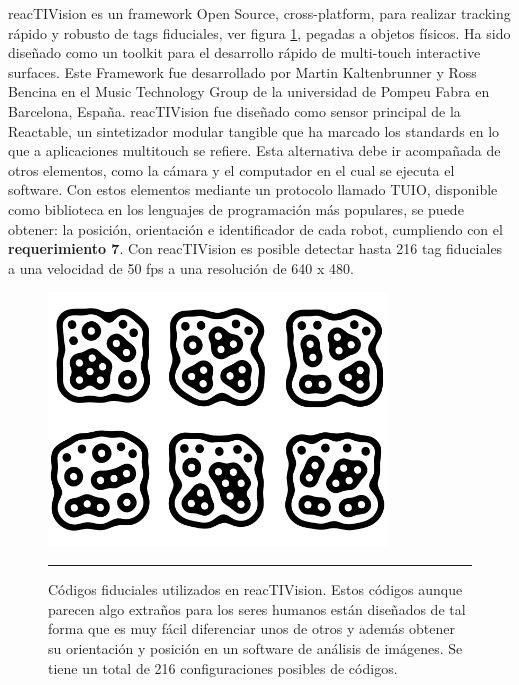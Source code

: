 reacTIVision \cite{kaltenbrunner2007reactivision} es un framework Open Source, cross-platform, para realizar tracking rápido y robusto de tags fiduciales, ver figura \ref{fig:Fiducial}, pegadas a objetos físicos. Ha sido diseñado como un toolkit para el desarrollo rápido de multi-touch interactive surfaces. Este Framework fue desarrollado por Martin Kaltenbrunner y Ross Bencina en el Music Technology Group de la universidad de Pompeu Fabra en Barcelona, España. reacTIVision fue diseñado como sensor principal de la Reactable, un sintetizador modular tangible que ha marcado los standards en lo que a aplicaciones multitouch se refiere. 
Esta alternativa debe ir acompañada de otros elementos, como la cámara y el computador en el cual se ejecuta el software. Con estos elementos mediante un protocolo llamado TUIO, disponible como biblioteca en los lenguajes de programación más populares, se puede obtener: la posición, orientación e identificador de cada robot, cumpliendo con el \textbf{requerimiento 7}. Con reacTIVision es posible detectar hasta 216 tag fiduciales a una velocidad de 50 fps a una resolución de 640 x 480.




\begin{figure}[htbp]
	\centering
		\includegraphics[width=0.8\textwidth]{./Figures/MODI/fiducial.png}
		\rule{35em}{0.5pt}
	\caption[Fiduciales usados como tag en reacTIVision]{Códigos fiduciales utilizados en reacTIVision. Estos códigos aunque parecen algo extraños para los seres humanos están diseñados de tal forma que es muy fácil diferenciar unos de otros y además obtener su orientación y posición en un software de análisis de imágenes. Se tiene un total de 216 configuraciones posibles de códigos.}
	\label{fig:Fiducial}
\end{figure}



